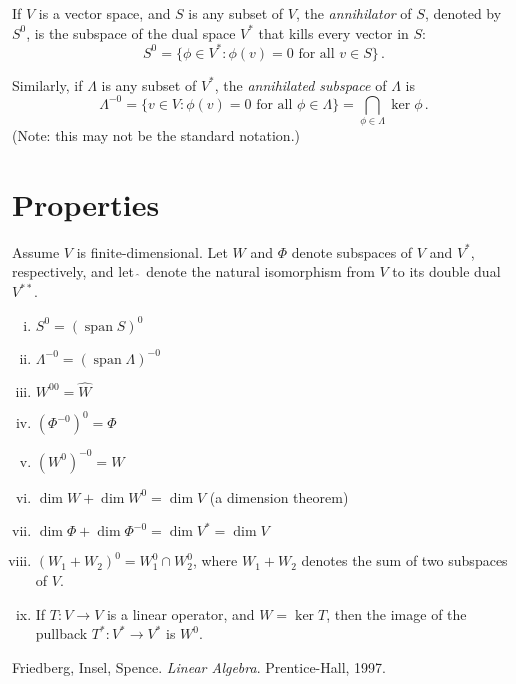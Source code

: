 \documentclass[12pt]{article}
\providecommand{\defnterm}[1]{\emph{#1}}
\DeclareMathOperator{\linspan}{span}
\begin{document}
If $V$ is a vector space, and $S$ is any subset of $V$,
the \defnterm{annihilator} of $S$, denoted by $S^0$,
is the subspace of the dual space $V^*$
that kills every vector in $S$:
\[
S^0 = \{ \phi \in V^* : \phi(v) = 0 \textrm{ for all } v \in S \}\,.
\]

Similarly, if $\Lambda$ is any subset of $V^*$, the \defnterm{annihilated subspace}
of $\Lambda$ is
\[
\Lambda^{-0} = \{ v \in V : \phi(v) = 0 \textrm{ for all } \phi \in \Lambda \}
= \bigcap_{\phi \in \Lambda} \ker \phi\,.
\]
(Note: this may not be the standard notation.)

\section{Properties}
Assume $V$ is finite-dimensional.
Let $W$ and $\Phi$ denote subspaces of $V$ and $V^*$, respectively,
and let $\widehat{\:}$ denote the natural isomorphism from $V$ to its double dual $V^{**}$.
\begin{enumerate}[i.]
\item
$S^0 = \left(\linspan S\right)^0$
\item
$\Lambda^{-0} = \left(\linspan \Lambda \right)^{-0}$
\item
$W^{00} = \widehat{W}$
\item
$\left(\Phi^{-0}\right)^0 = \Phi$
\item
$\left(W^0\right)^{-0} = W$
\item
$\dim W + \dim W^0 = \dim V$ (a dimension theorem)
\item
$\dim \Phi + \dim \Phi^{-0} = \dim V^* = \dim V$
\item
$(W_1 + W_2)^0 = W_1^0 \cap W_2^0$, where $W_1 + W_2$ denotes
the sum of two subspaces of $V$.
\item
If $T: V \to V$ is a linear operator, and $W = \ker T$,
then the image of the pullback $T^*: V^* \to V^*$ is $W^0$.
\end{enumerate}

\begin{thebibliography}{3}
 Friedberg, Insel, Spence. {\it Linear Algebra}. Prentice-Hall, 1997.
\end{thebibliography}
\end{document}
